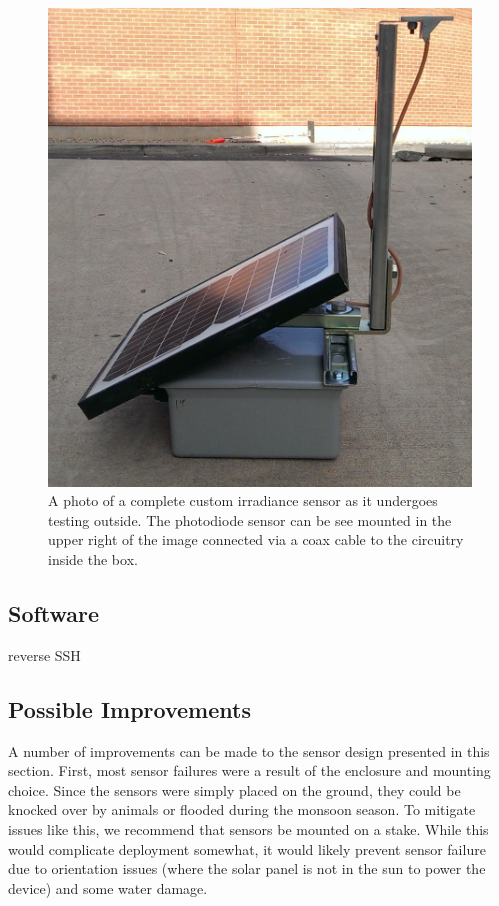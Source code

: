 \begin{figure}[p]
  \includegraphics[width=\textwidth]{figs/sensor_outside.jpg}
\caption[A complete custom sensor]{A photo of a complete custom
  irradiance sensor as it undergoes testing outside. The photodiode
  sensor can be see mounted in the upper right of the image connected
  via a coax cable to the circuitry inside the box.}
\label{fig:sensor_outside}
\end{figure}

\subsection{Software}

reverse SSH

\subsection{Possible Improvements}
A number of improvements can be made to the sensor design presented in
this section.
First, most sensor failures were a result of the enclosure and
mounting choice.
Since the sensors were simply placed on the ground, they could be
knocked over by animals or flooded during the monsoon season.
To mitigate issues like this, we recommend that sensors be mounted on
a stake.
While this would complicate deployment somewhat, it would likely
prevent sensor failure due to orientation issues (where the solar
panel is not in the sun to power the device) and some water damage.

